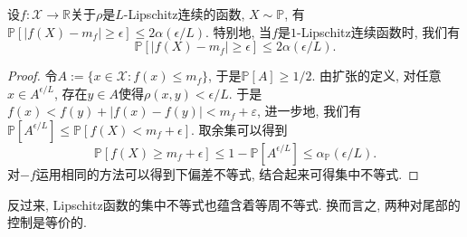 \begin{theorem}[Lévy不等式]
	设$f \colon \mathcal{X} \to \mathbb{R}$关于$\rho$是$L$-Lipschitz连续的函数, $X \sim \mathbb{P}$, 有$\mathbb{P}[ |f(X) - m_f| \geq \epsilon] \leq 2 \alpha(\epsilon / L)$. 
	特别地, 当$f$是$1$-Lipschitz连续函数时, 我们有
	\begin{equation*}
		\mathbb{P}[ |f(X) - m_f| \geq \epsilon] \leq 2 \alpha(\epsilon / L). 
	\end{equation*}
\end{theorem}
\begin{proof}
	令$A := \{x \in \mathcal{X} \colon f(x) \leq m_f\}$, 于是$\mathbb{P}[A] \geq 1/2$. 
	由扩张的定义, 对任意$x \in A^{\epsilon / L}$, 存在$y \in A$使得$\rho(x,y) < \epsilon / L$. 
	于是$f(x) < f(y) + |f(x) - f(y)| < m_f + \varepsilon$, 进一步地, 我们有$\mathbb{P}[A^{\epsilon / L}] \leq \mathbb{P}[f(X) < m_f + \epsilon]$. 
	取余集可以得到
	\begin{equation*}
		\mathbb{P}[f(X) \geq m_f + \epsilon] 
		\leq 1 - \mathbb{P}[A^{\epsilon / L}] 
		\leq \alpha_{\mathbb{P}}(\epsilon / L). 
	\end{equation*}
	对$-f$运用相同的方法可以得到下偏差不等式, 结合起来可得集中不等式. 
\end{proof}

反过来, Lipschitz函数的集中不等式也蕴含着等周不等式. 
换而言之, 两种对尾部的控制是等价的. 


